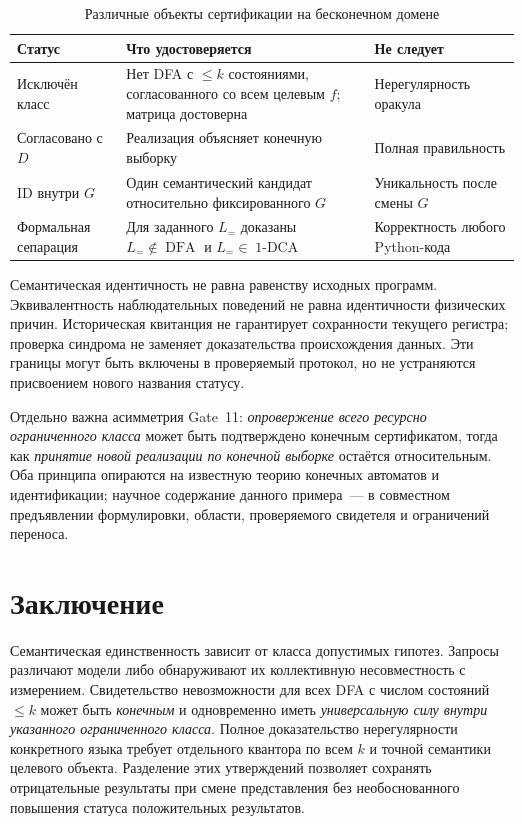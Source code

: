 \documentclass[11pt,a4paper]{article}
\newcommand{\DFA}{\operatorname{DFA}}
\newcommand{\oneDCA}{\operatorname{1\text{-}DCA}}
\begin{document}
\begin{table}[htbp]
\centering\small
\caption{Различные объекты сертификации на бесконечном домене}\label{tab:status}
\renewcommand{\arraystretch}{1.12}
\begin{tabularx}{\linewidth}{@{}>{\raggedright\arraybackslash}p{2.55cm}>{\raggedright\arraybackslash}X>{\raggedright\arraybackslash}p{3.05cm}@{}}
\toprule
\textbf{Статус} & \textbf{Что удостоверяется} & \textbf{Не следует}\\
\midrule
Исключён класс & Нет DFA с $\le k$ состояниями, согласованного со всем целевым $f$; матрица достоверна & Нерегулярность оракула\\
Согласовано с $D$ & Реализация объясняет конечную выборку & Полная правильность\\
ID внутри $G$ & Один семантический кандидат относительно фиксированного $G$ & Уникальность после смены $G$\\
Формальная сепарация & Для заданного $L_=$ доказаны $L_=\notin\DFA$ и $L_=\in\oneDCA$ & Корректность любого Python-кода\\
\bottomrule
\end{tabularx}
\end{table}

Семантическая идентичность не равна равенству исходных программ. Эквивалентность наблюдательных поведений не равна идентичности физических причин. Историческая квитанция не гарантирует сохранности текущего регистра; проверка синдрома не заменяет доказательства происхождения данных. Эти границы могут быть включены в проверяемый протокол, но не устраняются присвоением нового названия статусу.

Отдельно важна асимметрия Gate~11: \emph{опровержение всего ресурсно ограниченного класса} может быть подтверждено конечным сертификатом, тогда как \emph{принятие новой реализации по конечной выборке} остаётся относительным. Оба принципа опираются на известную теорию конечных автоматов и идентификации; научное содержание данного примера~--- в совместном предъявлении формулировки, области, проверяемого свидетеля и ограничений переноса.

\section{Заключение}

Семантическая единственность зависит от класса допустимых гипотез. Запросы различают модели либо обнаруживают их коллективную несовместность с измерением. Свидетельство невозможности для всех DFA с числом состояний $\le k$ может быть \emph{конечным} и одновременно иметь \emph{универсальную силу внутри указанного ограниченного класса}. Полное доказательство нерегулярности конкретного языка требует отдельного квантора по всем $k$ и точной семантики целевого объекта. Разделение этих утверждений позволяет сохранять отрицательные результаты при смене представления без необоснованного повышения статуса положительных результатов.
\end{document}
